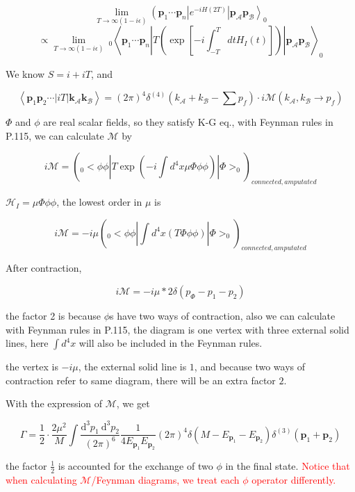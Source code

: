 \documentclass[11pt]{article} %
\begin{document}
\[
        \lim _{T \rightarrow \infty(1-i \epsilon)} \left(\mathbf{p}_{1} \cdots \mathbf{p}_{n}\left|e^{-i H(2 T)}\right| \mathbf{p}_{\mathcal{A}} \mathbf{p}_{\mathcal{B}}\right\rangle_{0} 
\]
\[
\propto \lim _{T \rightarrow \infty(1-i \epsilon)} \ _{0}\left\langle\mathbf{p}_{1} \cdots \mathbf{p}_{n}\left|T\left(\exp \left[-i \int_{-T}^{T} d t H_{I}(t)\right]\right)\right| \mathbf{p}_{\mathcal{A}} \mathbf{p}_{\mathcal{B}}\right\rangle_{0}
\]

We know $S = i + iT$, and

\[
    \left\langle\mathbf{p}_{1} \mathbf{p}_{2} \cdots|i T| \mathbf{k}_{\mathcal{A}} \mathbf{k}_{\mathcal{B}}\right\rangle=(2 \pi)^{4} \delta^{(4)}\left(k_{\mathcal{A}}+k_{\mathcal{B}}-\sum p_{f}\right) \cdot i \mathcal{M}\left(k_{\mathcal{A}}, k_{\mathcal{B}} \rightarrow p_{f}\right)    
\]

$\Phi$ and $\phi$ are real scalar fields, so they satisfy K-G eq., with Feynman rules in P.115, we can calculate $\mathcal{M}$ by

\[
    i \mathcal{M} = ( _{0}<\phi \phi|T{ \exp(-i \int d^4 x \mu \Phi \phi \phi) }|\Phi>_{0})_{connected, amputated}
\]

$\mathcal{H}_{I} = \mu \Phi \phi \phi$, the lowest order in $\mu$ is 

\[
    i \mathcal{M} = - i \mu ( _{0}<\phi \phi|\int d^4 x (T{  \Phi \phi \phi })|\Phi>_{0})_{connected, amputated}        
\]

After contraction, 

\[
    i \mathcal{M} = - i \mu * 2 \delta(p_{\Phi}-p_{1}-p_{2})        
\]

the factor 2 is because $\phi$s have two ways of contraction, also we can calculate with Feynman rules in P.115, the diagram is one vertex with three external solid lines, here $\int d^4 x$ will also be included in the Feynman rules.

the vertex is $-i \mu$, the external solid line is $1$, and because two ways of contraction refer to same diagram, there will be an extra factor $2$.

With the expression of $\mathcal{M}$, we get

\[
    \Gamma=\frac{1}{2} \cdot \frac{2 \mu^{2}}{M} \int \frac{\mathrm{d}^{3} p_{1} \mathrm{~d}^{3} p_{2}}{(2 \pi)^{6}} \frac{1}{4 E_{\mathbf{p}_{1}} E_{\mathbf{p}_{2}}}(2 \pi)^{4} \delta\left(M-E_{\mathbf{p}_{1}}-E_{\mathbf{p}_{2}}\right) \delta^{(3)}\left(\mathbf{p}_{1}+\mathbf{p}_{2}\right)    
\]

the factor $\frac{1}{2}$ is accounted for the exchange of two $\phi$ in the final state. \textcolor{red}{Notice that when calculating $\mathcal{M}$/Feynman diagrams, we treat each $\phi$ operator differently.}
\end{document}
